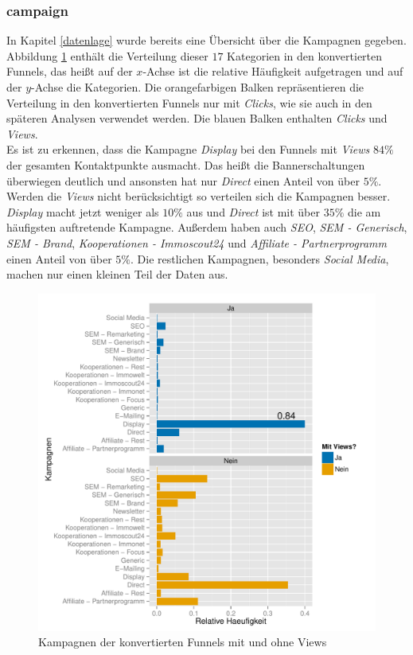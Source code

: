 \subsubsection*{campaign}
In Kapitel \ref{datenlage} wurde bereits eine Übersicht über die Kampagnen gegeben. Abbildung \ref{campaignSucc} enthält die Verteilung dieser $17$ Kategorien in den konvertierten Funnels, das heißt auf der $x$-Achse ist die relative Häufigkeit aufgetragen und auf der $y$-Achse die Kategorien. Die orangefarbigen Balken repräsentieren die Verteilung in den konvertierten Funnels nur mit \textit{Clicks}, wie sie auch in den späteren Analysen verwendet werden. Die blauen Balken enthalten \textit{Clicks} und \textit{Views}.\\
Es ist zu erkennen, dass die Kampagne \textit{Display} bei den Funnels mit \textit{Views} $84 \%$ der gesamten Kontaktpunkte ausmacht. Das heißt die Bannerschaltungen überwiegen deutlich und ansonsten hat nur \textit{Direct} einen Anteil von über $5 \%$.\\
Werden die \textit{Views} nicht berücksichtigt so verteilen sich die Kampagnen besser. \textit{Display} macht jetzt weniger als $10 \%$ aus und \textit{Direct} ist mit über $35 \%$ die am häufigsten auftretende Kampagne. Außerdem haben auch \textit{SEO}, \textit{SEM - Generisch}, \textit{SEM - Brand}, \textit{Kooperationen - Immoscout24} und \textit{Affiliate - Partnerprogramm} einen Anteil von über $5 \%$. Die restlichen Kampagnen, besonders \textit{Social Media}, machen nur einen kleinen Teil der Daten aus.
\begin{figure}[H]
    \centering
    \includegraphics[scale=0.5]{campaignSucc.pdf}
    \caption[Kampagnen der konvertierten Funnels]{Kampagnen der konvertierten Funnels mit und ohne Views}
    \label{campaignSucc}
\end{figure}

